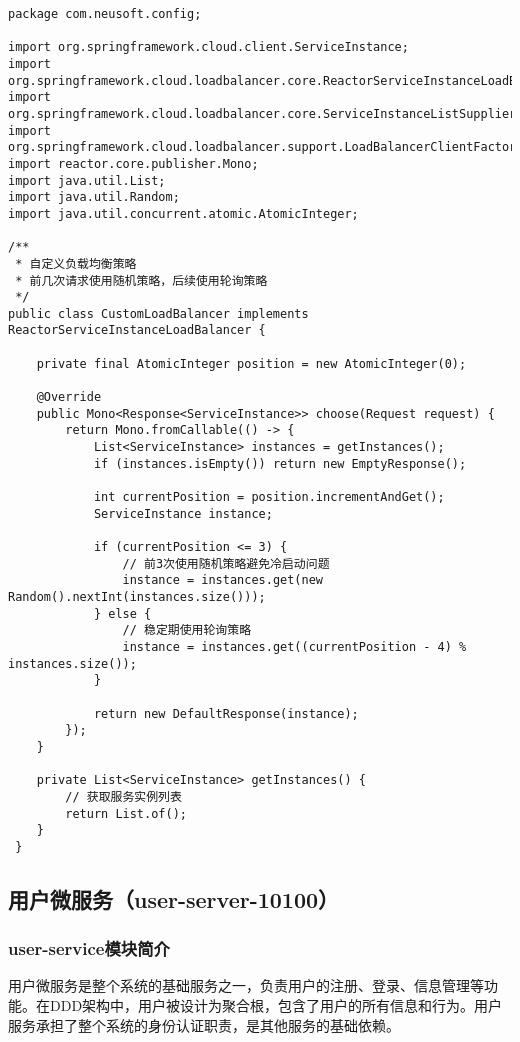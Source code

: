 \documentclass[a4paper,12pt]{article}
\begin{document}
\begin{lstlisting}[caption=自定义负载均衡配置]
package com.neusoft.config;

import org.springframework.cloud.client.ServiceInstance;
import org.springframework.cloud.loadbalancer.core.ReactorServiceInstanceLoadBalancer;
import org.springframework.cloud.loadbalancer.core.ServiceInstanceListSupplier;
import org.springframework.cloud.loadbalancer.support.LoadBalancerClientFactory;
import reactor.core.publisher.Mono;
import java.util.List;
import java.util.Random;
import java.util.concurrent.atomic.AtomicInteger;

/**
 * 自定义负载均衡策略
 * 前几次请求使用随机策略，后续使用轮询策略
 */
public class CustomLoadBalancer implements ReactorServiceInstanceLoadBalancer {
    
    private final AtomicInteger position = new AtomicInteger(0);
    
    @Override
    public Mono<Response<ServiceInstance>> choose(Request request) {
        return Mono.fromCallable(() -> {
            List<ServiceInstance> instances = getInstances();
            if (instances.isEmpty()) return new EmptyResponse();
            
            int currentPosition = position.incrementAndGet();
            ServiceInstance instance;
            
            if (currentPosition <= 3) {
                // 前3次使用随机策略避免冷启动问题
                instance = instances.get(new Random().nextInt(instances.size()));
            } else {
                // 稳定期使用轮询策略
                instance = instances.get((currentPosition - 4) % instances.size());
            }
            
            return new DefaultResponse(instance);
        });
    }
    
    private List<ServiceInstance> getInstances() {
        // 获取服务实例列表
        return List.of();
    }
 }
 \end{lstlisting}

\subsection{用户微服务（user-server-10100）}

\subsubsection{user-service模块简介}

用户微服务是整个系统的基础服务之一，负责用户的注册、登录、信息管理等功能。在DDD架构中，用户被设计为聚合根，包含了用户的所有信息和行为。用户服务承担了整个系统的身份认证职责，是其他服务的基础依赖。
\end{document}
